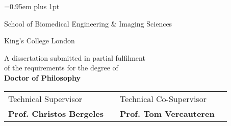 \begin{titlepage}

\pagestyle{empty}


\vspace*{1.5cm}

\begin{center}
	{\LARGE{\theauthor}\par}
\end{center}
\vspace{0.6cm}
\begin{center}
        {\huge\baselineskip=0.95em plus 1pt \expandafter{
        \textbf{\thetitle}
        \par}}
\end{center}


\vspace{3cm}

\begin{center}
	\expandafter{\LARGE{School of Biomedical Engineering \& Imaging Sciences}\par}
	\expandafter{\Large{\textrm{King's College London}}}\par
\end{center}

\vspace{1.5cm}

\begin{center}
	A dissertation submitted in partial fulfilment 
	\\
	of the requirements for the degree of
	\\ 
	\textbf{Doctor of Philosophy}	
\end{center}

\vspace{0.2cm}
\begin{center}
\end{center}

\vspace{1.0cm}

\begin{center}
\begin{tabular}{l p{3.3cm} l l}
	
Technical Supervisor & & Technical Co-Supervisor \\
\textbf{Prof. Christos Bergeles} & & \textbf{Prof. Tom Vercauteren}
	
\end{tabular}
\end{center}

\end{titlepage} 